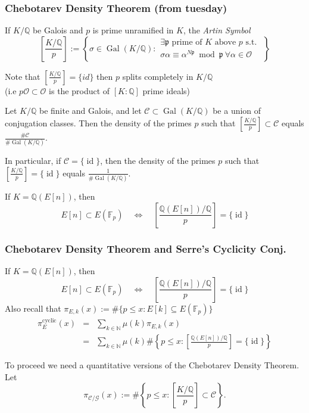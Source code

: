 \documentclass[10pt,handout]{beamer} %
\newcommand{\Q}{\mathbb Q}
\newcommand{\N}{\mathbb N}
\newcommand{\F}{\mathbb F}
\theoremstyle{definition}
\begin{document}
\begin{frame}
\frametitle{Chebotarev Density Theorem  (from tuesday)} 


If $K/\Q$ be Galois and $p$ is prime unramified in $K$, the \emph{Artin Symbol}\pause
$$\left[\frac{K/\Q}p\right]:=\left\{\sigma\in\operatorname{Gal}(K/\Q): 
\begin{array}{l}
\exists\mathfrak p\text{ prime of $K$ above $p$ s.t. }\\
\sigma\alpha\equiv \alpha^{N\mathfrak p}\bmod \mathfrak p\ \forall \alpha\in\mathcal{O}
\end{array}\right\}$$\pause

Note that $\left[\frac{K/\Q}p\right]=\{id\}$ then $p$ splits completely in $K/\Q$ 
\\ \pause (i.e $p\mathcal O\subset\mathcal O$ is the product of $[K:\Q]$ prime ideals)\pause


\begin{theorem}
Let $K/\Q$ be finite and Galois, and let 
$\mathcal C\subset\operatorname{Gal}(K/\Q)$ be a union of conjugation classes. \pause
Then the density of the primes $p$ such that 
$\left[\frac{K/\Q}p\right]\subset \mathcal C$ equals $\frac{\#\mathcal C}{\#\operatorname{Gal}(K/\Q)}.$ \pause

In particular, if $\mathcal{C}=\{\operatorname{id}\}$, then the density of the primes $p$ such that 
$\left[\frac{K/\Q}p\right]=\{\operatorname{id}\}$ equals $\frac1{\#\operatorname{Gal}(K/\Q)}.$
\end{theorem}\pause

If $K=\Q(E[n])$, then
$$E[n]\subset {E}(\F_p)\quad\Longleftrightarrow \quad \left[\frac{\Q(E[n])/\Q}p\right]=\{\operatorname{id}\}$$

\end{frame}

\begin{frame}
\frametitle{Chebotarev Density Theorem and Serre's Cyclicity Conj.} 

If $K=\Q(E[n])$, then
$$E[n]\subset {E}(\F_p)\quad\Longleftrightarrow \quad \left[\frac{\Q(E[n])/\Q}p\right]=\{\operatorname{id}\}$$
\pause
Also recall that $\pi_{E,k}(x):=\#\{p\le x: E[k]\subseteq E(\F_p)\}$\pause
\begin{eqnarray*}
\pi_E^{\text{cyclic}}(x)&=&\sum_{k\in\N}\mu(k)\pi_{E,k}(x)\\
                        &=&\sum_{k\in\N}\mu(k)\#\left\{p\le x: \left[\frac{\Q(E[n])/\Q}p\right]=\{\operatorname{id}\}\right\}
\end{eqnarray*}
\pause

To proceed we need  a quantitative versions of the Chebotarev Density Theorem. Let
$$\pi_{\mathcal C/\mathcal G}(x):=\#\left\{p\le x: \left[\frac{K/\Q}p\right]\subset \mathcal C\right\}.$$
\end{frame}
\end{document}
